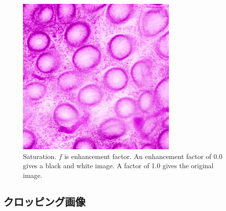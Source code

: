 \begin{figure}[H]
\begin{minipage}{0.25\columnwidth}
	\end{minipage}
	\begin{minipage}{0.25\columnwidth}
		\centering
		\includegraphics[clip, width=\linewidth]{fig/preprocessing/data_aug/color/SATURATION/SATURATION_1_50}
	\end{minipage}	
	
	\caption{Saturation. $f$ is enhancement factor. An enhancement factor of 0.0 gives a black and white image. A factor of 1.0 gives the original image.}
	\label{fig:彩度}

\end{figure}

\subsection{クロッピング画像}

